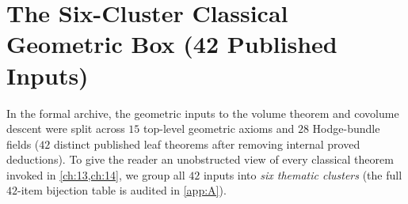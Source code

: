 \section{The Six-Cluster Classical Geometric Box (42 Published Inputs)}
\label{sec:13:six-clusters}

In the formal archive, the geometric inputs to the volume theorem and covolume descent were split across $15$ top-level geometric axioms and $28$ Hodge-bundle fields ($42$ distinct published leaf theorems after removing internal proved deductions). To give the reader an unobstructed view of every classical theorem invoked in \cref{ch:13,ch:14}, we group all $42$ inputs into \emph{six thematic clusters} (the full $42$-item bijection table is audited in \cref{app:A}).


